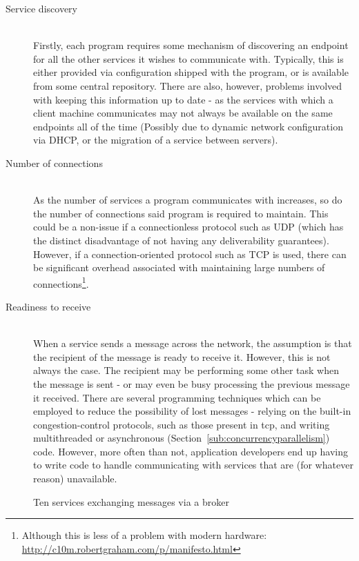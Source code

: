 \begin{description}
  \item[Service discovery] \hfill \\
  Firstly, each program requires some mechanism of discovering an endpoint for
  all the other services it wishes to communicate with. Typically, this is
  either provided via configuration shipped with the program, or is available
  from some central repository. There are also, however, problems involved with
  keeping this information up to date - as the services with which a client
  machine communicates may not always be available on the same endpoints all of
  the time (Possibly due to dynamic network configuration via DHCP, or the
  migration of a service between servers).
  \item[Number of connections] \hfill \\
  As the number of services a program communicates with increases, so do the
  number of connections said program is required to maintain. This could be a
  non-issue if a connectionless protocol such as UDP (which has the distinct
  disadvantage of not having any deliverability guarantees). However, if a
  connection-oriented protocol such as TCP is used, there can be significant
  overhead associated with maintaining large numbers of
  connections\footnote{Although this is less of a problem with modern hardware:
  \url{http://c10m.robertgraham.com/p/manifesto.html}}.
  \item[Readiness to receive] \hfill \\
  When a service sends a message across the network, the assumption is that the
  recipient of the message is ready to receive it.  However, this is not always
  the case. The recipient may be performing some other task when the message is
  sent - or may even be busy processing the previous message it received. There
  are several programming techniques which can be employed to reduce the
  possibility of lost messages - relying on  the built-in congestion-control
  protocols, such as those present in \gls{tcp}, and writing multithreaded or
  asynchronous (Section~\ref{sub:concurrencyparallelism}) code. However,
  more often than not, application developers end up having to write code to
  handle communicating with services that are (for whatever reason) unavailable.
\end{description}

\begin{figure}[ht]
  \centering
  
  \caption{Ten services exchanging messages via a broker}
  \label{fig:tikz:messageBroker}
\end{figure}

